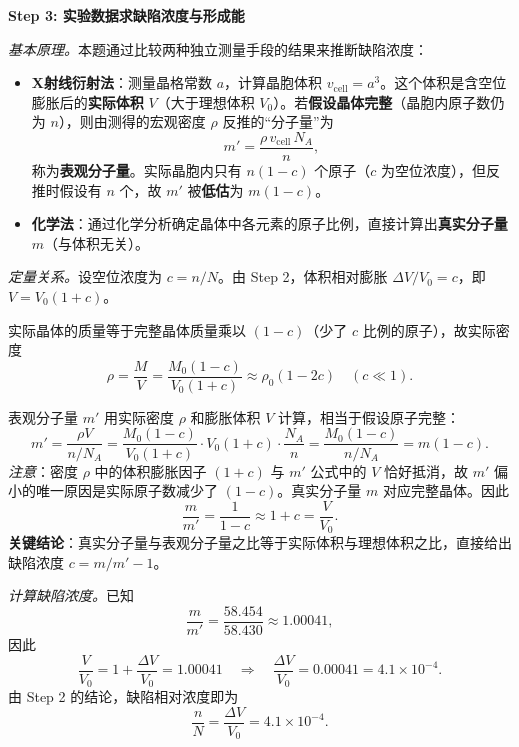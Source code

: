 \begin{derivationbox}[标准解题过程]
\textbf{Step 3: 实验数据求缺陷浓度与形成能}

\textit{基本原理。}本题通过比较两种独立测量手段的结果来推断缺陷浓度：
\begin{itemize}
    \item \textbf{X射线衍射法}：测量晶格常数 $a$，计算晶胞体积 $v_{\mathrm{cell}}=a^3$。这个体积是含空位膨胀后的\textbf{实际体积} $V$（大于理想体积 $V_0$）。若\textbf{假设晶体完整}（晶胞内原子数仍为 $n$），则由测得的宏观密度 $\rho$ 反推的``分子量''为
    \begin{equation}
    m' = \frac{\rho\,v_{\mathrm{cell}}\,N_{\!A}}{n},
    \end{equation}
    称为\textbf{表观分子量}。实际晶胞内只有 $n(1-c)$ 个原子（$c$ 为空位浓度），但反推时假设有 $n$ 个，故 $m'$ 被\textbf{低估}为 $m(1-c)$。
    \item \textbf{化学法}：通过化学分析确定晶体中各元素的原子比例，直接计算出\textbf{真实分子量} $m$（与体积无关）。
\end{itemize}

\textit{定量关系。}设空位浓度为 $c=n/N$。由 Step 2，体积相对膨胀 $\Delta V/V_0 = c$，即 $V = V_0(1+c)$。

实际晶体的质量等于完整晶体质量乘以 $(1-c)$（少了 $c$ 比例的原子），故实际密度
\begin{equation}
\rho = \frac{M}{V} = \frac{M_0(1-c)}{V_0(1+c)} \approx \rho_0(1-2c)\quad(c\ll 1).
\end{equation}

表观分子量 $m'$ 用实际密度 $\rho$ 和膨胀体积 $V$ 计算，相当于假设原子完整：
\begin{equation}
m' = \frac{\rho V}{n/N_{\!A}} = \frac{M_0(1-c)}{V_0(1+c)} \cdot V_0(1+c) \cdot \frac{N_{\!A}}{n} = \frac{M_0(1-c)}{n/N_{\!A}} = m(1-c).
\end{equation}
\textit{注意}：密度 $\rho$ 中的体积膨胀因子 $(1+c)$ 与 $m'$ 公式中的 $V$ 恰好抵消，故 $m'$ 偏小的唯一原因是实际原子数减少了 $(1-c)$。真实分子量 $m$ 对应完整晶体。因此
\begin{equation}
\frac{m}{m'} = \frac{1}{1-c} \approx 1+c = \frac{V}{V_0}.
\end{equation}
\textbf{关键结论}：真实分子量与表观分子量之比等于实际体积与理想体积之比，直接给出缺陷浓度 $c = m/m' - 1$。

\textit{计算缺陷浓度。}已知
\begin{equation}
\frac{m}{m'} = \frac{58.454}{58.430} \approx 1.00041,
\end{equation}
因此
\begin{equation}
\frac{V}{V_0} = 1 + \frac{\Delta V}{V_0} = 1.00041
\quad\Longrightarrow\quad
\frac{\Delta V}{V_0} = 0.00041 = 4.1\times 10^{-4}.
\end{equation}
由 Step 2 的结论，缺陷相对浓度即为
\begin{equation}
\boxed{\frac{n}{N} = \frac{\Delta V}{V_0} = 4.1\times 10^{-4}.}
\end{equation}


\end{derivationbox}
